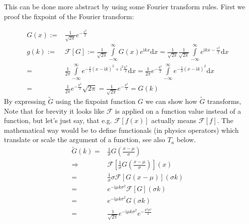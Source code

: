 \documentclass[10pt,a4paper]{article}
\begin{document}
This can be done more abstract by using some Fourier transform rules.
First we proof the fixpoint of the Fourier transform:

\begin{align}
G(x) := & \frac{1}{\sqrt{2\pi}} e^{ -\frac{ x^2 }{2} } \\
g(k) := & \mathcal{F}\left[ G \right]
   :=   \frac{1}{\sqrt{2\pi}}
        \int\limits_{-\infty}^{\infty} G(x) e^{\mathrm{i} k x} \mathrm{d}x
    =   \frac{1}{\sqrt{2\pi}} \frac{1}{\sqrt{2\pi}}
        \int\limits_{-\infty}^{\infty} e^{\mathrm{i} k x - \frac{ x^2 }{2} }
        \mathrm{d}x \\
    = & \frac{1}{2\pi} \int\limits_{-\infty}^{\infty}
        e^{ - \frac{1}{2} \left( x - \mathrm{i} k \right)^2 +
            \mathrm{i}^2 \frac{ k^2 }{2} } \mathrm{d}x
    =   \frac{1}{2\pi} e^{ - \frac{ k^2 }{2} } \int\limits_{-\infty}^{\infty}
        e^{ - \frac{1}{2} \left( x - \mathrm{i} k \right)^2 } \mathrm{d}x \\
    = & \frac{1}{2\pi} e^{ - \frac{ k^2 }{2} } \sqrt{2\pi}
    =   \frac{1}{ \sqrt{2\pi} } e^{ - \frac{ k^2 }{2} }
    =   G(k)
\end{align}
By expressing $\tilde{G}$ using the fixpoint function $G$ we can show how $\tilde{G}$ transforms,
Note that for brevity it looks like $\mathcal{F}$ is applied on a function value instead of a function, but let's just say, that e.g. $\mathcal{F}\left[f(x)\right]$ actually means $\mathcal{F}\left[f\right]$.
The mathematical way would be to define functionals (in physics operators) which translate or scale the argument of a function, see also $T_a$ below.
\begin{align}
    \tilde{G}(k) = & \frac{1}{\sigma} G\left( \frac{x-\mu}{\sigma} \right) \\
    \Rightarrow &
        \mathcal{F}\left[
            \frac{1}{\sigma} G\left( \frac{x-\mu}{\sigma} \right)
        \right]\left( x \right) \\
    = & \frac{1}{\sigma} \sigma \mathcal{F}\left[
            G\left( x-\mu \right) \right]( \sigma k ) \\
    = & e^{ - \mathrm{i} \mu k \sigma^2  }
        \mathcal{F} \left[G \right](\sigma k) \\
    = & e^{ -\mathrm{i} \mu k \sigma^2 } G( \sigma k ) \\
    = & \frac{1}{ \sqrt{2\pi} }
        e^{ - \mathrm{i} \mu k \sigma^2  }
        e^{ -\frac{ k^2\sigma^2 }{ 2 } }
\end{align}

\end{document}
